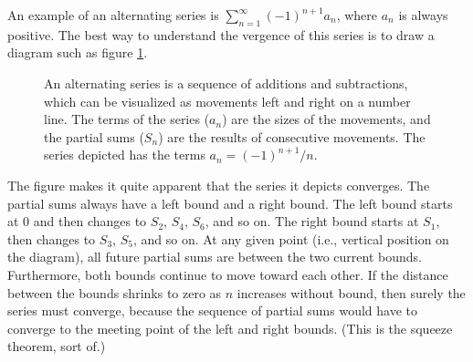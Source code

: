 \documentclass{myarticle}
\theoremstyle{nospace}
\newtheorem{old series theorem}{Theorem}
\newenvironment{series theorem}
{\begin{mdframed}\begin{old series theorem}}
    {\end{old series theorem}\end{mdframed}}
\begin{document}
An example of an alternating series is
$\sum_{n=1}^\infty (-1)^{n+1} a_n$, where $a_n$ is always positive.
The best way to understand the vergence of this series is to draw a
diagram such as figure \ref{fig:alternating series}.

\begin{figure}[htb!] \centering
  \caption{An alternating series is a sequence of additions and
    subtractions, which can be visualized as movements left and right
    on a number line. The terms of the series ($a_n$) are the sizes of
    the movements, and the partial sums ($S_n$) are the results of
    consecutive movements. The series depicted has the terms
    $a_n = (-1)^{n+1}/n$.}
  \label{fig:alternating series}
\end{figure}

The figure makes it quite apparent that the series it depicts
converges. The partial sums always have a left bound and a right
bound. The left bound starts at $0$ and then changes to $S_2$, $S_4$,
$S_6$, and so on. The right bound starts at $S_1$, then changes to
$S_3$, $S_5$, and so on. At any given point (i.e., vertical position
on the diagram), all future partial sums are between the two current
bounds. Furthermore, both bounds continue to move toward each other.
If the distance between the bounds shrinks to zero as $n$ increases
without bound, then surely the series must converge, because the
sequence of partial sums would have to converge to the meeting point
of the left and right bounds. (This is the squeeze theorem, sort of.)
\end{document}
